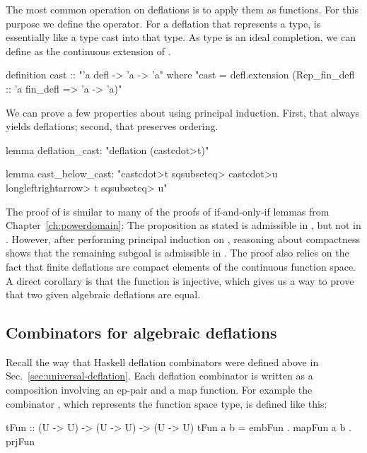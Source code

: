 The most common operation on deflations is to apply them as functions. For this purpose we define the  operator. For a deflation  that represents a type,  is essentially like a type cast into that type. As type  is an ideal completion, we can define  as the continuous extension of .

\begin{isacode}
definition cast :: "'a defl -> 'a -> 'a"
  where "cast = defl.extension (Rep_fin_defl :: 'a fin_defl => 'a -> 'a)"
\end{isacode}

We can prove a few properties about  using principal induction. First, that  always yields deflations; second, that  preserves ordering.
%
\begin{isacode}
lemma deflation_cast: "deflation (cast\<cdot>t)"
\end{isacode}
\unmedskip
{}
\begin{isacode}
lemma cast_below_cast: "cast\<cdot>t \<sqsubseteq> cast\<cdot>u \<longleftrightarrow> t \<sqsubseteq> u"
\end{isacode}
%
The proof of  is similar to many of the proofs of if-and-only-if lemmas from Chapter~\ref{ch:powerdomain}: The proposition as stated is admissible in , but not in . However, after performing principal induction on , reasoning about compactness shows that the remaining subgoal is admissible in . The proof also relies on the fact that finite deflations are compact elements of the continuous function space. A direct corollary is that the  function is injective, which gives us a way to prove that two given algebraic deflations are equal.

\subsection{Combinators for algebraic deflations}
\label{sec:definitional-alg-combinators}

Recall the way that Haskell deflation combinators were defined above in Sec.~\ref{sec:universal-deflation}. Each deflation combinator is written as a composition involving an ep-pair and a map function. For example the combinator , which represents the function space type, is defined like this:

\begin{hscode}
tFun :: (U -> U) -> (U -> U) -> (U -> U)
tFun a b = embFun . mapFun a b . prjFun
\end{hscode}

